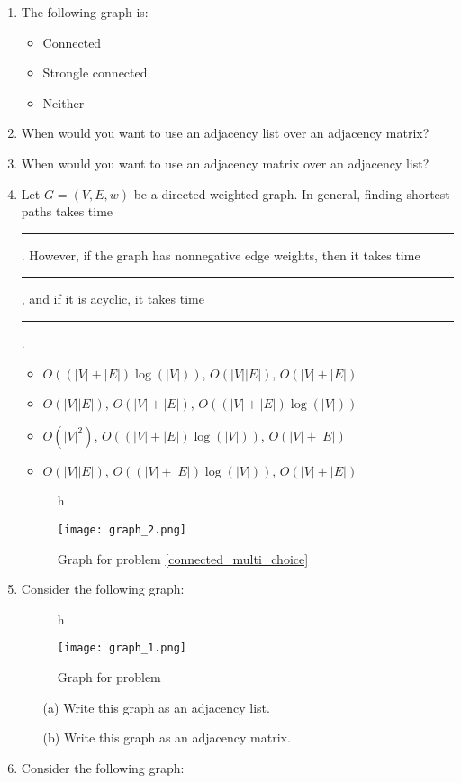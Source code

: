 \documentclass[12pt]{article}
\begin{document}
\newpage
\begin{enumerate}
    \item The following graph is:
    \begin{itemize}
        \item Connected
        \item Strongle connected
        \item Neither
    \end{itemize}
    \item When would you want to use an adjacency list over an adjacency matrix? 
    
    \item When would you want to use an adjacency matrix over an adjacency list?
    \item Let $G = (V,E,w)$ be a directed weighted graph. In general, finding shortest paths takes time \rule{1cm}{0.15mm}. However, if the graph has nonnegative edge weights, then it takes time \rule{1cm}{0.15mm}, and if it is acyclic, it takes time \rule{1cm}{0.15mm}. 
    \begin{itemize}
        \item $O((|V|+|E|)\log(|V|))$, $O(|V||E|)$, $O(|V|+|E|)$
        \item $O(|V||E|)$, $O(|V|+|E|)$, $O((|V|+|E|)\log(|V|))$
        \item $O(|V|^2)$, $O((|V|+|E|)\log(|V|))$, $O(|V|+|E|)$
        \item $O(|V||E|)$, $O((|V|+|E|)\log(|V|))$, $O(|V|+|E|)$
    \end{itemize} 
    \label{connected_multi_choice}
    \begin{figure}{h}
        \caption{Graph for problem \ref{connected_multi_choice}}
        \texttt{[image: graph\_2.png]}
    \end{figure}   
    \item Consider the following graph:
    \begin{figure}{h}
        \caption{Graph for problem }
        \texttt{[image: graph\_1.png]}
    \end{figure}
    \begin{itemize}
        \item[(a)] Write this graph as an adjacency list.
        \item[(b)] Write this graph as an adjacency matrix.
    \end{itemize}
    \item Consider the following graph: 

\end{enumerate}
\end{document}
